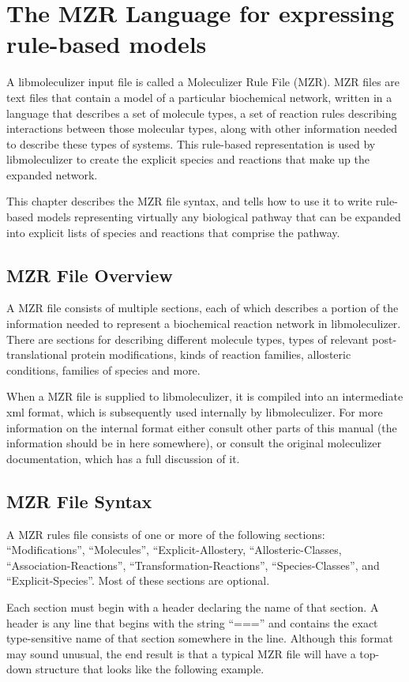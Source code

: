 \chapter{The MZR Language for expressing rule-based models}
\label{chap:theRulesChapter}
A libmoleculizer input file is called a Moleculizer Rule File (MZR).
MZR files are text files that contain a model of a particular
biochemical network, written in a language that describes a set of
molecule types, a set of reaction rules describing interactions
between those molecular types, along with other information needed to
describe these types of systems.  This rule-based representation is
used by libmoleculizer to create the explicit species and reactions
that make up the expanded network.

This chapter describes the MZR file syntax, and tells how to use it to
write rule-based models representing virtually any biological pathway
that can be expanded into explicit lists of species and reactions that
comprise the pathway.  

\section{MZR File Overview}
A MZR file consists of multiple sections, each of which describes a
portion of the information needed to represent a biochemical reaction
network in libmoleculizer.  There are sections for describing
different molecule types, types of relevant post-translational protein
modifications, kinds of reaction families, allosteric conditions,
families of species and more.

When a MZR file is supplied to libmoleculizer, it is compiled into an
intermediate xml format, which is subsequently used internally by
libmoleculizer.  For more information on the internal format either
consult other parts of this manual (the information should be in here
somewhere), or consult the original moleculizer documentation, which
has a full discussion of it.

\section{MZR File Syntax}
A MZR rules file consists of one or more of the following sections:
``Modifications'', ``Molecules'', ``Explicit-Allostery, ``Allosteric-Classes,
``Association-Reactions'', ``Transformation-Reactions'', ``Species-Classes'', and
``Explicit-Species''.  Most of these sections are optional.

Each section must begin with a header declaring the name of that
section.  A header is any line that begins with the string ``==='' and
contains the exact type-sensitive name of that section somewhere in
the line.  Although this format may sound unusual, the end result is
that a typical MZR file will have a top-down structure that looks like
the following example.

